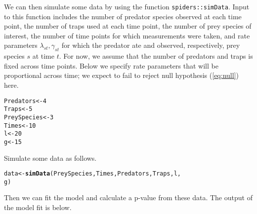 \documentclass[12pt]{article}\usepackage[]{graphicx}\usepackage[]{color}
\makeatletter
\newcommand{\hlnum}[1]{\textcolor[rgb]{0.686,0.059,0.569}{#1}}%
\newcommand{\hlstd}[1]{\textcolor[rgb]{0.345,0.345,0.345}{#1}}%
\newcommand{\hlkwb}[1]{\textcolor[rgb]{0.69,0.353,0.396}{#1}}%
\newcommand{\hlkwd}[1]{\textcolor[rgb]{0.737,0.353,0.396}{\textbf{#1}}}%
\newenvironment{kframe}{%
 \def\at@end@of@kframe{}%
 \ifinner\ifhmode%
  \def\at@end@of@kframe{\end{minipage}}%
  \begin{minipage}{\columnwidth}%
 \fi\fi%
 \def\FrameCommand##1{\hskip\@totalleftmargin \hskip-\fboxsep
 \colorbox{shadecolor}{##1}\hskip-\fboxsep
     \hskip-\linewidth \hskip-\@totalleftmargin \hskip\columnwidth}%
 \MakeFramed {\advance\hsize-\width
   \@totalleftmargin\z@ \linewidth\hsize
   \@setminipage}}%
 {\par\unskip\endMakeFramed%
 \at@end@of@kframe}
\newenvironment{knitrout}{}{} %
\makeatother
\begin{document}
We can then simulate some data by using the function \texttt{spiders::simData}.  Input to this function includes the number of predator species observed at each time point, the number of traps used at each time point, the number of prey species of interest, the number of time points for which measurements were taken, and rate parameters $\lambda_{st}, \gamma_{st}$ for which the predator ate and observed, respectively, prey species $s$ at time $t$.  For now, we assume that the number of predators and traps is fixed across time points.  Below we specify rate parameters that will be proportional across time; we expect to fail to reject null hypothesis (\ref{eq:null}) here. 

\begin{knitrout}
\color{fgcolor}\begin{kframe}
\begin{alltt}
\hlstd{Predators} \hlkwb{<-} \hlnum{4}
\hlstd{Traps} \hlkwb{<-} \hlnum{5}
\hlstd{PreySpecies} \hlkwb{<-} \hlnum{3}
\hlstd{Times} \hlkwb{<-} \hlnum{10}
\hlstd{l} \hlkwb{<-} \hlnum{20}
\hlstd{g} \hlkwb{<-} \hlnum{15}
\end{alltt}
\end{kframe}
\end{knitrout}


Simulate some data as follows.

\begin{knitrout}
\color{fgcolor}\begin{kframe}
\begin{alltt}
\hlstd{data} \hlkwb{<-} \hlkwd{simData}\hlstd{(PreySpecies, Times, Predators, Traps, l,}
    \hlstd{g)}
\end{alltt}
\end{kframe}
\end{knitrout}


Then we can fit the model and calculate a p-value from these data.  The output of the model fit is below.
\end{document}
